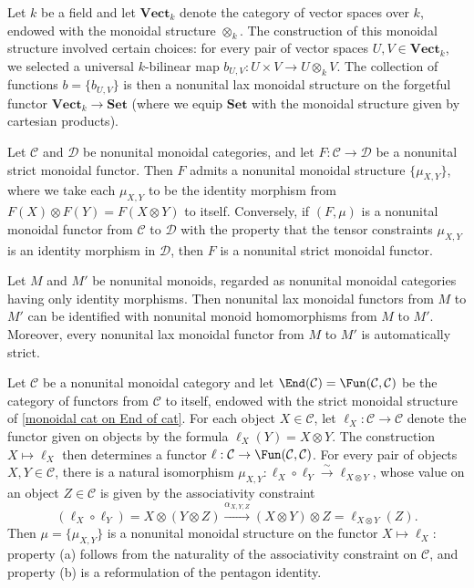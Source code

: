 \begin{example}
Let $k$ be a field and let $\mathbf{Vect}_k$ denote the category of vector spaces over $k$, endowed with the monoidal structure $\otimes_k$. The construction of this monoidal structure involved certain choices: for every pair of vector spaces $U,V\in\mathbf{Vect}_k$, we selected a universal $k$-bilinear map $b_{U,V}:U\times V\to U\otimes_kV$. The collection of functions $b=\{b_{U,V}\}$ is then a nonunital lax monoidal structure on the forgetful functor $\mathbf{Vect}_k\to\mathbf{Set}$ (where we equip $\mathbf{Set}$ with the monoidal structure given by cartesian products).
\end{example}
\begin{example}
Let $\mathcal{C}$ and $\mathcal{D}$ be nonunital monoidal categories, and let $F:\mathcal{C}\to\mathcal{D}$ be a nonunital strict monoidal functor. Then $F$ admits a nonunital monoidal structure $\{\mu_{X,Y}\}$, where we take each $\mu_{X,Y}$ to be the identity morphism from $F(X)\otimes F(Y)=F(X\otimes Y)$ to itself. Conversely, if $(F,\mu)$ is a nonunital monoidal functor from $\mathcal{C}$ to $\mathcal{D}$ with the property that the tensor constraints $\mu_{X,Y}$ is an identity morphism in $\mathcal{D}$, then $F$ is a nonunital strict monoidal functor.
\end{example}
\begin{example}
Let $M$ and $M'$ be nonunital monoids, regarded as nonunital monoidal categories having only identity morphisms. Then nonunital lax monoidal functors from $M$ to $M'$ can be identified with nonunital monoid homomorphisms from $M$ to $M'$. Moreover, every nonunital lax monoidal functor from $M$ to $M'$ is automatically strict.
\end{example}
\begin{example}
Let $\mathcal{C}$ be a nonunital monoidal category and let $\End(\mathcal{C})=\Fun(\mathcal{C},\mathcal{C})$ be the category of functors from $\mathcal{C}$ to itself, endowed with the strict monoidal structure of \cref{monoidal cat on End of cat}. For each object $X\in\mathcal{C}$, let $\ell_X:\mathcal{C}\to\mathcal{C}$ denote the functor given on objects by the formula $\ell_X(Y)=X\otimes Y$. The construction $X\mapsto\ell_X$ then determines a functor $\ell:\mathcal{C}\to\Fun(\mathcal{C},\mathcal{C})$. For every pair of objects $X,Y\in\mathcal{C}$, there is a natural isomorphism $\mu_{X,Y}:\ell_X\circ\ell_Y\stackrel{\sim}{\to}\ell_{X\otimes Y}$, whose value on an object $Z\in\mathcal{C}$ is given by the associativity constraint
\[(\ell_X\circ\ell_Y)=X\otimes(Y\otimes Z)\stackrel{\alpha_{X,Y,Z}}{\to}(X\otimes Y)\otimes Z=\ell_{X\otimes Y}(Z).\]
Then $\mu=\{\mu_{X,Y}\}$ is a nonunital monoidal structure on the functor $X\mapsto\ell_X$: property (a) follows from the naturality of the associativity constraint on $\mathcal{C}$, and property (b) is a reformulation of the pentagon identity.
\end{example}
